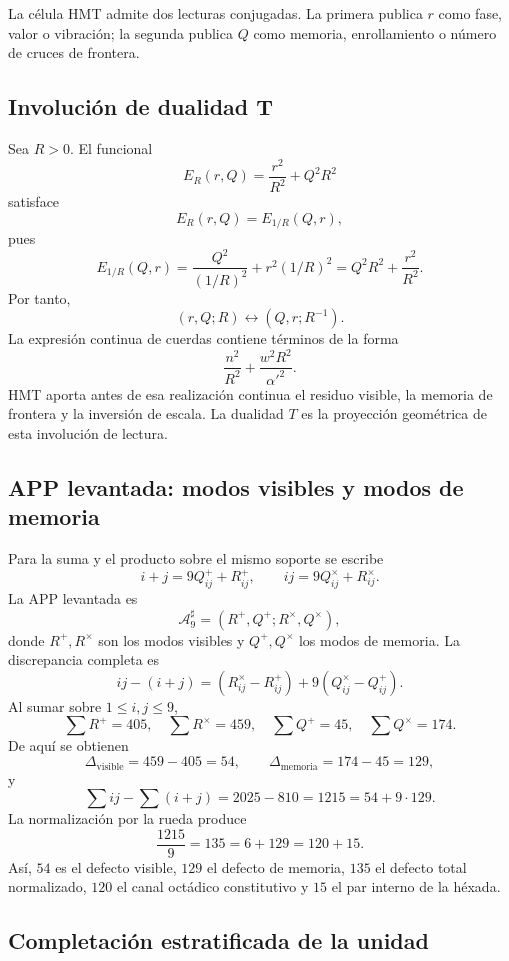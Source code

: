 \begin{principle}
La célula HMT admite dos lecturas conjugadas. La primera publica \(r\) como
fase, valor o vibración; la segunda publica \(Q\) como memoria,
enrollamiento o número de cruces de frontera.
\end{principle}

\subsection{Involución de dualidad T}

Sea \(R>0\). El funcional
\[
E_R(r,Q)=\frac{r^2}{R^2}+Q^2R^2
\]
satisface
\[
E_R(r,Q)=E_{1/R}(Q,r),
\]
pues
\[
E_{1/R}(Q,r)
=\frac{Q^2}{(1/R)^2}+r^2(1/R)^2
=Q^2R^2+\frac{r^2}{R^2}.
\]
Por tanto,
\[
(r,Q;R)\longleftrightarrow(Q,r;R^{-1}).
\]
La expresión continua de cuerdas contiene términos de la forma
\[
\frac{n^2}{R^2}+\frac{w^2R^2}{\alpha'^2}.
\]
HMT aporta antes de esa realización continua el residuo visible, la memoria
de frontera y la inversión de escala. La dualidad \(T\) es la proyección
geométrica de esta involución de lectura.

\subsection{APP levantada: modos visibles y modos de memoria}

Para la suma y el producto sobre el mismo soporte se escribe
\[
i+j=9Q^+_{ij}+R^+_{ij},
\qquad
ij=9Q^\times_{ij}+R^\times_{ij}.
\]
La APP levantada es
\[
\mathcal A_9^\sharp=(R^+,Q^+;R^\times,Q^\times),
\]
donde \(R^+,R^\times\) son los modos visibles y
\(Q^+,Q^\times\) los modos de memoria. La discrepancia completa es
\[
ij-(i+j)
=(R^\times_{ij}-R^+_{ij})
+9(Q^\times_{ij}-Q^+_{ij}).
\]
Al sumar sobre \(1\leq i,j\leq9\),
\[
\sum R^+=405,
\quad
\sum R^\times=459,
\quad
\sum Q^+=45,
\quad
\sum Q^\times=174.
\]
De aquí se obtienen
\[
\Delta_{\mathrm{visible}}=459-405=54,
\qquad
\Delta_{\mathrm{memoria}}=174-45=129,
\]
y
\[
\sum ij-\sum(i+j)=2025-810=1215=54+9\cdot129.
\]
La normalización por la rueda produce
\[
\frac{1215}{9}=135=6+129=120+15.
\]
Así, \(54\) es el defecto visible, \(129\) el defecto de memoria,
\(135\) el defecto total normalizado, \(120\) el canal octádico constitutivo
y \(15\) el par interno de la héxada.

\subsection{Completación estratificada de la unidad}

